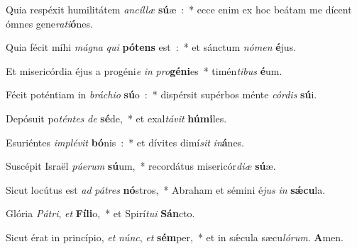 ﻿\item Quia respéxit humilitátem \emph{an}\-\emph{cíl}\-\emph{læ} \textbf{sú}\-æ~:~* ecce enim ex hoc beátam me dícent ómnes gene\emph{ra}\emph{ti}\textbf{ó}nes.
\item Quia fécit míhi \emph{má}\-\emph{gna} \emph{qui} \textbf{pó}\-\textbf{tens} est~:~* et sánctum \emph{nó}\-\emph{men} \textbf{é}jus.
\item Et misericórdia éjus a progéni\emph{e} \emph{in} \emph{pro}\-\textbf{gé}\-\textbf{ni}\-es~* timén\emph{ti}\-\emph{bus} \textbf{é}um.
\item Fécit poténtiam in \emph{brá}\-\emph{chi}\-\emph{o} \textbf{sú}\-o~:~* dispérsit supérbos ménte \emph{cór}\-\emph{dis} \textbf{sú}i.
\item Depósuit po\emph{tén}\-\emph{tes} \emph{de} \textbf{sé}\-de,~* et exal\emph{tá}\-\emph{vit} \textbf{hú}\textbf{mi}les.
\item Esuriéntes \emph{im}\-\emph{plé}\-\emph{vit} \textbf{bó}\-nis~:~* et dívites dimí\emph{sit} \emph{in}\textbf{á}nes.
\item Suscépit Israël \emph{pú}\-\emph{e}\-\emph{rum} \textbf{sú}\-um,~* recordátus misericór\emph{di}\-\emph{æ} \textbf{sú}æ.
\item Sicut locútus est \emph{ad} \emph{pá}\-\emph{tres} \textbf{nó}\-stros,~* Abraham et sémini é\emph{jus} \emph{in} \textbf{sǽ}\textbf{cu}la.
\item Glória \emph{Pá}\-\emph{tri}, \emph{et} \textbf{Fí}\-\textbf{li}\-o,~* et Spirí\emph{tu}\-\emph{i} \textbf{Sán}cto.
\item Sicut érat in princípio, \emph{et} \emph{núnc}, \emph{et} \textbf{sém}\-per,~* et in sǽcula sæcu\emph{ló}\-\emph{rum}. \textbf{A}men.
